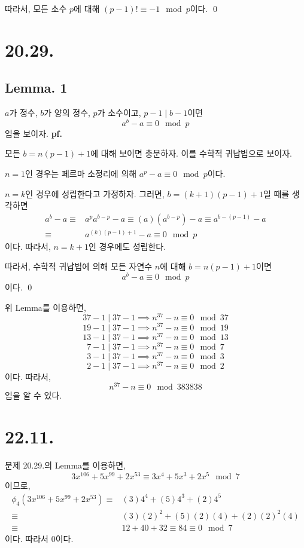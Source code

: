 \documentclass{article}
\begin{document}
따라서, 모든 소수 $p$에 대해 $(p-1)! \equiv -1 \mod p$이다. \qed

\section{20.29.}
\subsection{Lemma. 1}
$a$가 정수, $b$가 양의 정수, $p$가 소수이고, $p-1 \mid b-1$이면
$$a^b - a \equiv 0 \mod p$$
임을 보이자.
\textbf{pf.}

모든 $b = n(p-1) + 1$에 대해 보이면 충분하자. 이를 수학적 귀납법으로 보이자.

$n = 1$인 경우는 페르마 소정리에 의해 $a^{p} - a \equiv 0 \mod p$이다. 

$n = k$인 경우에 성립한다고 가정하자. 그러면, $b = (k+1)(p-1) + 1$일 때를 생각하면
\begin{align*}
a^{b} - a \equiv& a^{p} a^{b-p} - a \equiv (a)(a^{b-p}) - a \equiv a^{b-(p-1)} - a
\\ \equiv& a^{(k)(p-1) + 1} - a \equiv 0 \mod p
\end{align*}
이다. 따라서, $n = k+1$인 경우에도 성립한다.

따라서, 수학적 귀납법에 의해 모든 자연수 $n$에 대해 $b = n(p-1) + 1$이면 
$$a^b - a \equiv 0 \mod p$$
이다. \qed

위 Lemma를 이용하면,
$$37-1 \mid 37 - 1 \implies n^{37} - n \equiv 0 \mod 37$$
$$19-1 \mid 37 - 1 \implies n^{37} - n \equiv 0 \mod 19$$
$$13-1 \mid 37 - 1 \implies n^{37} - n \equiv 0 \mod 13$$
$$7-1 \mid 37 - 1 \implies n^{37} - n \equiv 0 \mod 7$$
$$3-1 \mid 37 - 1 \implies n^{37} - n \equiv 0 \mod 3$$
$$2-1 \mid 37 - 1 \implies n^{37} - n \equiv 0 \mod 2$$
이다. 따라서,
$$n^{37} - n \equiv 0 \mod 383838$$
임을 알 수 있다.

\section{22.11.}
문제 20.29.의 Lemma를 이용하면,
$$3x^{106}+5x^{99}+2x^{53} \equiv 3x^4 + 5x^3 + 2x^5 \mod 7$$
이므로,
\begin{align*}
\phi_4(3x^{106}+5x^{99}+2x^{53}) \equiv& (3)4^4 + (5)4^3 + (2)4^5
\\ \equiv& (3)(2)^2 + (5)(2)(4) + (2)(2)^2(4)
\\ \equiv& 12 + 40 + 32 \equiv 84 \equiv 0 \mod 7
\end{align*}
이다. 따라서 $0$이다.
\end{document}
